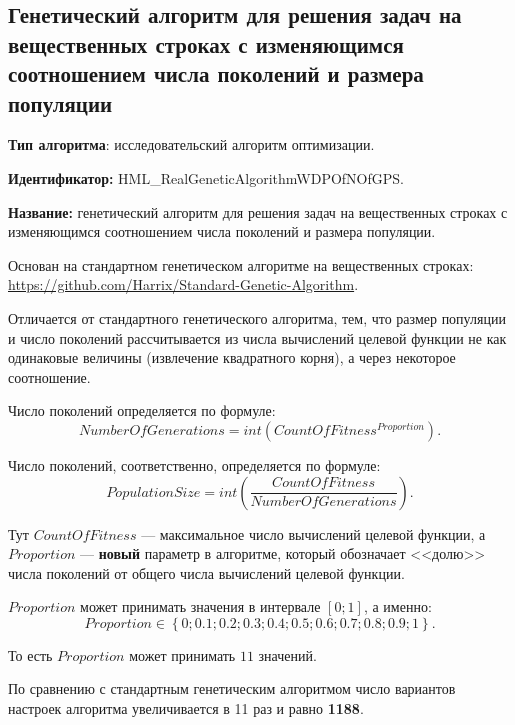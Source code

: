 \subsection{Генетический алгоритм для решения задач на вещественных строках с изменяющимся соотношением числа поколений и размера популяции}\label{HarrixOptimizationAlgorithms:HML_RealGeneticAlgorithmWDPOfNOfGPS}

\textbf{Тип алгоритма}: исследовательский алгоритм оптимизации.

\textbf{Идентификатор:} HML\_RealGeneticAlgorithmWDPOfNOfGPS.

\textbf{Название:} генетический алгоритм для решения задач на вещественных строках с изменяющимся соотношением числа поколений и размера популяции.

Основан на стандартном генетическом алгоритме на вещественных строках:  \href{https://github.com/Harrix/Standard-Genetic-Algorithm}{https://github.com/Harrix/Standard-Genetic-Algorithm}. 

Отличается от стандартного генетического алгоритма, тем, что размер популяции и число поколений рассчитывается из числа вычислений целевой функции не как одинаковые величины (извлечение квадратного корня), а через некоторое соотношение.

Число поколений определяется по формуле:
\begin{equation}
NumberOfGenerations = int \left( CountOfFitness^{Proportion}\right).
\end{equation}

Число поколений, соответственно, определяется по формуле:
\begin{equation}
PopulationSize = int \left( \dfrac{CountOfFitness}{NumberOfGenerations}\right).
\end{equation}


Тут $CountOfFitness$ --- максимальное число вычислений целевой функции, а $Proportion$ --- \textbf{новый} параметр в алгоритме, который обозначает <<долю>> числа поколений от общего числа вычислений целевой функции.

$Proportion$ может принимать значения в интервале $ [0;1] $, а именно:
\begin{equation}
Proportion \in \left\lbrace 0; 0.1; 0.2; 0.3; 0.4; 0.5; 0.6; 0.7; 0.8; 0.9; 1\right\rbrace .
\end{equation}

То есть $Proportion$ может принимать $ 11 $ значений.

По сравнению с стандартным генетическим алгоритмом число вариантов настроек алгоритма увеличивается в 11 раз и равно \textbf{1188}.

